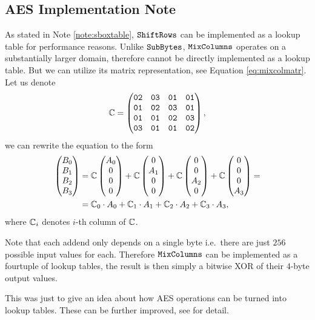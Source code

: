 \subsection{AES Implementation Note}
\label{sec:aeslookup}

As stated in Note \ref{note:sboxtable}, $\texttt{ShiftRows}$ can be implemented as a lookup table for performance reasons. Unlike $\texttt{SubBytes}$, $\texttt{MixColumns}$ operates on a substantially larger domain, therefore cannot be directly implemented as a lookup table. But we can utilize its matrix representation, see Equation \ref{eq:mixcolmatr}. Let us denote
\[
	\mathbb{C} =
	\begin{pmatrix}
		\texttt{02} & \texttt{03} & \texttt{01} & \texttt{01} \\
		\texttt{01} & \texttt{02} & \texttt{03} & \texttt{01} \\
		\texttt{01} & \texttt{01} & \texttt{02} & \texttt{03} \\
		\texttt{03} & \texttt{01} & \texttt{01} & \texttt{02}
	\end{pmatrix} ,
\]
we can rewrite the equation to the form
\begin{align*}
	\begin{pmatrix}
			B_0 \\ B_1 \\ B_2 \\ B_3
		\end{pmatrix}
		&=
		\mathbb{C}
		\begin{pmatrix}
			A_0 \\ 0 \\ 0 \\ 0
		\end{pmatrix}
		+
		\mathbb{C}
		\begin{pmatrix}
			0 \\ A_1 \\ 0 \\ 0
		\end{pmatrix}
		+
		\mathbb{C}
		\begin{pmatrix}
			0 \\ 0 \\ A_2 \\ 0
		\end{pmatrix}
		+
		\mathbb{C}
		\begin{pmatrix}
			0 \\ 0 \\ 0 \\ A_3
		\end{pmatrix}
		= \\
		&=
		\mathbb{C}_0 \cdot A_0   
		 +
		\mathbb{C}_1 \cdot A_1  
		 +
		\mathbb{C}_2 \cdot A_2 
		 +
		\mathbb{C}_3 \cdot A_3 ,
\end{align*}
where $\mathbb{C}_i$ denotes $i$-th column of $\mathbb{C}$.

Note that each addend only depends on a single byte i.e.\ there are just $256$ possible input values for each. Therefore $\texttt{MixColumns}$ can be implemented as a fourtuple of lookup tables, the result is then simply a bitwise XOR of their $4$-byte output values.

This was just to give an idea about how AES operations can be turned into lookup tables. These can be further improved, see \cite[Chapter~4]{daemen2013rijndael} for detail.

